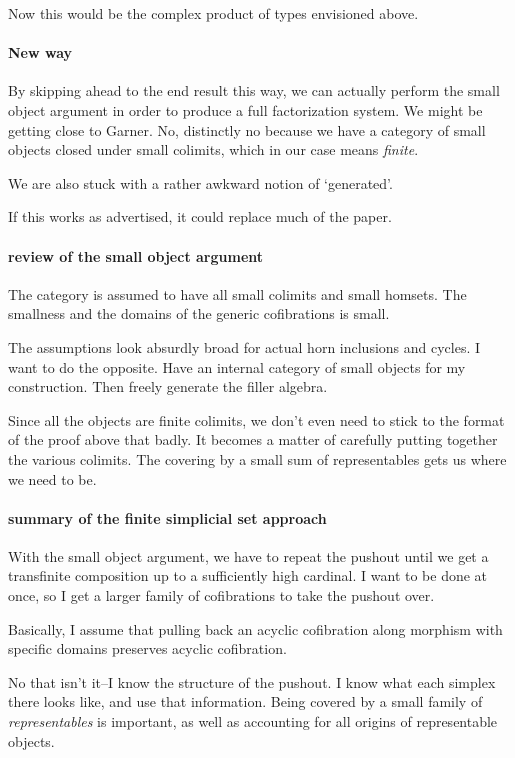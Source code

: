 \documentclass[csh.tex]{subfiles}
\begin{document}
Now this would be the complex product of types envisioned above.

\paragraph{New way}
By skipping ahead to the end result this way, we can actually perform the small object argument in order to produce a full factorization system. We might be getting close to Garner. No, distinctly no because we have a category of small objects closed under small colimits, which in our case means \emph{finite}.

We are also stuck with a rather awkward notion of `generated'. 

If this works as advertised, it could replace much of the paper.

\paragraph{review of the small object argument}
The category is assumed to have all small colimits and small homsets. The smallness and the domains of the generic cofibrations is small. 

The assumptions look absurdly broad for actual horn inclusions and cycles. I want to do the opposite. Have an internal category of small objects for my construction. Then freely generate the filler algebra.

Since all the objects are finite colimits, we don't even need to stick to the format of the proof above that badly. It becomes a matter of carefully putting together the various colimits. The covering by a small sum of representables gets us where we need to be.

\paragraph{summary of the finite simplicial set approach}
With the small object argument, we have to repeat the pushout until we get a transfinite composition up to a sufficiently high cardinal. I want to be done at once, so I get a larger family of cofibrations to take the pushout over.

Basically, I assume that pulling back an acyclic cofibration along morphism with specific domains preserves acyclic cofibration.

No that isn't it--I know the structure of the pushout. I know what each simplex there looks like, and use that information. Being covered by a small family of \emph{representables} is important, as well as accounting for all origins of representable objects.
\end{document}
